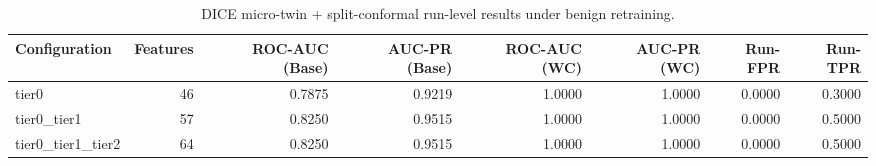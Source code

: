 \begin{table}[t]
\centering
\caption{DICE micro-twin + split-conformal run-level results under benign retraining.}
\label{tab:dice_full_overall}
\footnotesize
\begin{tabular}{lrrrrrrr}
\toprule
Configuration & Features & ROC-AUC (Base) & AUC-PR (Base) & ROC-AUC (WC) & AUC-PR (WC) & Run-FPR & Run-TPR \\
\midrule
tier0 & 46 & 0.7875 & 0.9219 & 1.0000 & 1.0000 & 0.0000 & 0.3000 \\
tier0_tier1 & 57 & 0.8250 & 0.9515 & 1.0000 & 1.0000 & 0.0000 & 0.5000 \\
tier0_tier1_tier2 & 64 & 0.8250 & 0.9515 & 1.0000 & 1.0000 & 0.0000 & 0.5000 \\
\bottomrule
\end{tabular}

\end{table}
